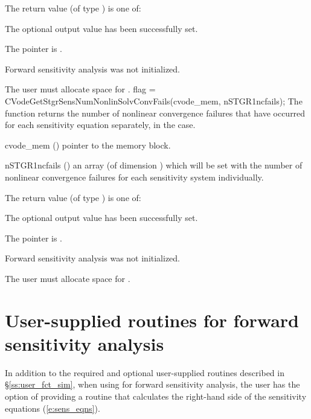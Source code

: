 {
  The return value  (of type ) is one of:
  \begin{args}
  \item[\Id{CV\_SUCCESS}] 
    The optional output value has been successfully set.
  \item[\Id{CV\_MEM\_NULL}]
    The  pointer is .
  \item[\Id{CV\_NO\_SENS}]
    Forward sensitivity analysis was not initialized.
  \end{args}
}
{
  {\warn}The user must allocate space for .
}
{
  flag = CVodeGetStgrSensNumNonlinSolvConvFails(cvode\_mem, nSTGR1ncfails);
}
{
  The function  returns the
  number of nonlinear convergence failures that have occurred for
  each sensitivity equation separately, in the  case.
}
{
  \begin{args}
  \item[cvode\_mem] ()
    pointer to the {\cvodes} memory block.
  \item[nSTGR1ncfails] ()
    an array (of dimension ) which will be set with the
    number of nonlinear convergence failures for each sensitivity system individually.
  \end{args}
}
{
  The return value  (of type ) is one of:
  \begin{args}
  \item[\Id{CV\_SUCCESS}] 
    The optional output value has been successfully set.
  \item[\Id{CV\_MEM\_NULL}]
    The  pointer is .
  \item[\Id{CV\_NO\_SENS}]
    Forward sensitivity analysis was not initialized.
  \end{args}
}
{
  {\warn}The user must allocate space for .
}
\section{User-supplied routines for forward sensitivity analysis}
\label{s:user_fct_fwd}

In addition to the required and optional user-supplied routines described
in \S\ref{ss:user_fct_sim}, when using {\cvodes} for forward sensitivity analysis,
the user has the option of providing a routine that calculates the right-hand side 
of the sensitivity equations (\ref{e:sens_eqns}).

